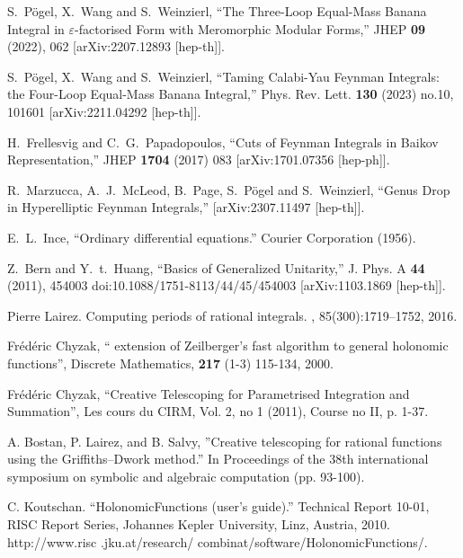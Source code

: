 \documentclass[a4paper,12pt]{article}
\numberwithin{equation}{section}
\numberwithin{figure}{section}
\begin{document}
\begin{thebibliography}{99}
S.~P\"ogel, X.~Wang and S.~Weinzierl,
``The Three-Loop Equal-Mass Banana Integral in \ensuremath{\varepsilon}-factorised Form with Meromorphic Modular Forms,''
JHEP \textbf{09} (2022), 062
[arXiv:2207.12893 [hep-th]].


S.~P\"ogel, X.~Wang and S.~Weinzierl,
``Taming Calabi-Yau Feynman Integrals: the Four-Loop Equal-Mass Banana Integral,''
Phys. Rev. Lett. \textbf{130} (2023) no.10, 101601
[arXiv:2211.04292 [hep-th]].
  
  H.~Frellesvig and C.~G.~Papadopoulos,
  ``Cuts of Feynman Integrals in Baikov Representation,''
  JHEP {\bf 1704} (2017) 083
  [arXiv:1701.07356 [hep-ph]].
  
R.~Marzucca, A.~J.~McLeod, B.~Page, S.~P\"ogel and S.~Weinzierl,
``Genus Drop in Hyperelliptic Feynman Integrals,''
[arXiv:2307.11497 [hep-th]].

 E.~L.~Ince, ``Ordinary differential equations.''
  Courier Corporation  (1956).
 

  
Z.~Bern and Y.~t.~Huang,
``Basics of Generalized Unitarity,''
J. Phys. A \textbf{44} (2011), 454003
doi:10.1088/1751-8113/44/45/454003
[arXiv:1103.1869 [hep-th]].

Pierre Lairez.
\newblock Computing periods of rational integrals.
, 85(300):1719--1752, 2016.
\newblock [arXiv:1404.5069]

  Fr\'ed\'eric Chyzak, `` extension of
    Zeilberger's fast algorithm to general holonomic functions'',
Discrete Mathematics, {\bf 217} (1-3) 115-134, 2000.

 Fr\'ed\'eric Chyzak, ``Creative Telescoping for
  Parametrised Integration and Summation'',  Les cours du CIRM,  Vol. 2, no 1 (2011), Course no II, p. 1-37.

 A. Bostan, P. Lairez, and B. Salvy,
  ''Creative telescoping for rational functions using the
  Griffiths--Dwork method.'' In Proceedings of the 38th international
  symposium on symbolic and algebraic computation (pp. 93-100). 


 C. Koutschan. ``HolonomicFunctions (user's guide).'' Technical Report 10-01, RISC Report Series, Johannes Kepler University, Linz, Austria, 2010. http://www.risc
.jku.at/research/ combinat/software/HolonomicFunctions/.
	
	


\end{thebibliography}
\end{document}
